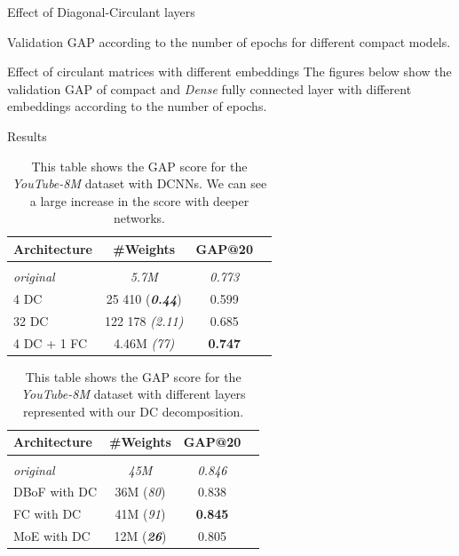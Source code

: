 \documentclass[9pt]{beamer}
\newcommand{\yt}{\textit{YouTube-8M}\xspace}
\begin{document}
\begin{frame}{Effect of Diagonal-Circulant layers}
\begin{figure}[!htb]
  \centering
  \scalebox{0.8}{}
\end{figure}
Validation GAP according to the number of epochs for different compact models.
\end{frame}

\begin{frame}{Effect of circulant matrices with different embeddings}
The figures below show the validation GAP of \textmd{compact} and \textit{Dense} fully connected layer with different embeddings according to the number of epochs.
\large
\begin{figure}[!htb]
  \centering
  \captionsetup{justification=justified}
  \scalebox{0.7}{}
\end{figure}
\end{frame}



\begin{frame}{Results}

\begin{table}
  \centering
  \caption{ \small This table shows the GAP score for the \yt dataset with DCNNs. We can see a large increase in the score with deeper networks.}
  \small
  \begin{tabular}{lccc}
    \toprule
    \textbf{Architecture} & \textbf{\#Weights} &
    \textbf{GAP@20} \\
    \hline \\
    \textit{original} & \textit{5.7M} & \textit{0.773} \\
    4 DC & 25 410  (\textit{\bf 0.44}) & 0.599   \\
    32 DC  & 122 178 \textit{(2.11)} & 0.685   \\
    4 DC + 1 FC & 4.46M \textit{(77)} & \textbf{0.747} \\
  \hline
  \end{tabular}
  \label{table:youtube_agg_xp}
\end{table}


\begin{table}
  \centering
  \caption{ \small This table shows the GAP score for the \yt dataset with different layers represented with our DC decomposition.}
  \small
  \begin{tabular}{lccc}
  \toprule
  \textbf{Architecture} & \textbf{\#Weights} & \textbf{GAP@20} \\
  \hline \\
  \textit{original} & \textit{45M} & \textit{0.846} \\
  DBoF with DC   & 36M (\textit{80}) & 0.838 \\
  FC with DC    & 41M (\textit{91}) & \textbf{0.845} \\
  MoE with DC   & 12M (\textit{\bf 26}) & 0.805 \\
  \hline
  \end{tabular}
  \label{table:youtube_full_xp}
\end{table}

\end{frame}
\end{document}
